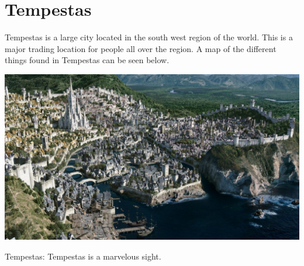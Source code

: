 \section{Tempestas}

Tempestas is a large city located in the south west region of the world. This is a major trading location for people all over the region. A map of the different things found in Tempestas can be seen below.

\begin{center}
	\includegraphics[width=\linewidth]{img/1200px-StormwindPanorama.jpg}
	
	{Tempestas: Tempestas is a marvelous sight.}
\end{center}

